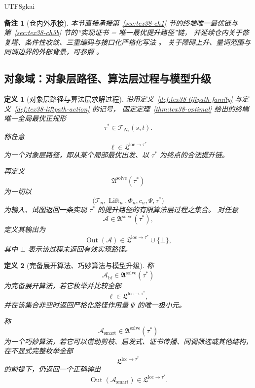 \documentclass[12pt]{article}
\newtheorem{definition}{定义}[section]
\newtheorem{remark}{备注}[section]
\newcommand{\Lift}{\operatorname{Lift}}
\begin{document}
\begin{CJK*}{UTF8}{gkai}
\begin{remark}[仓内外承接]
本节直接承接第~\ref{sec:tex38-ch1} 节的终端唯一最优链与第~\ref{sec:tex38-ch3b} 节的“实现证书 = 唯一最优提升路径”链，
并延续仓内关于修复塔、条件性收敛、三重编码与接口化严格化写法
\cite{RepoTex29TransfiniteRepair,RepoTex31RepairTower,RepoTex32ConditionalConvergence,RepoTex36HomotopyTwistBijection,
  RepoTex37GainEvaluation}。
关于障碍上升、量词范围与同调边界的外部背景，可参照
\cite{Whitehead1978Elements,Weibel1994HomologicalAlgebra}。
\end{remark}

\subsection{对象域：对象层路径、算法层过程与模型升级}
\label{subsec:tex38-smart-objects}

\begin{definition}[对象层路径与算法层求解过程]
\label{def:tex38-smart-objects}
沿用定义~\ref{def:tex38-liftpath-family} 与定义~\ref{def:tex38-liftpath-action} 的记号，
固定定理~\ref{thm:tex38-optimal} 给出的终端唯一全局最优正规形
\[
  \tau^\ast\in\mathcal T_{N_\ast}(s,t).
\]
称任意
\[
  \ell\in\mathfrak L^{\mathrm{loc}\to\tau^\ast}
\]
为一个\emph{对象层路径}，即从某个局部最优出发、以 $\tau^\ast$ 为终点的合法提升链。

再定义
\[
  \mathfrak A^{\mathrm{solve}}(\tau^\ast)
\]
为一切以
\[
  \bigl(\mathcal T_n,\Lift_n,\Phi_n,c_n,\Psi,\tau^\ast\bigr)
\]
为输入、试图返回一条实现 $\tau^\ast$ 的提升路径的有限算法层过程之集合。
对任意
\[
  \mathcal A\in\mathfrak A^{\mathrm{solve}}(\tau^\ast),
\]
定义其输出为
\[
  \operatorname{Out}(\mathcal A)\in
  \mathfrak L^{\mathrm{loc}\to\tau^\ast}\cup\{\bot\},
\]
其中 $\bot$ 表示该过程未返回有效实现路径。
\end{definition}

\begin{definition}[完备展开算法、巧妙算法与模型升级]
\label{def:tex38-smart-algorithm}
称
\[
  \mathcal A_{\mathrm{bf}}\in\mathfrak A^{\mathrm{solve}}(\tau^\ast)
\]
为\emph{完备展开算法}，若它枚举并比较全部
\[
  \ell\in\mathfrak L^{\mathrm{loc}\to\tau^\ast},
\]
并在该集合非空时返回严格化路径作用量 $\Psi$ 的唯一极小元。

称
\[
  \mathcal A_{\mathrm{smart}}\in\mathfrak A^{\mathrm{solve}}(\tau^\ast)
\]
为一个\emph{巧妙算法}，若它可以借助剪枝、启发式、证书传播、同调筛选或其他结构，
在不显式完整枚举全部
\[
  \mathfrak L^{\mathrm{loc}\to\tau^\ast}
\]
的前提下，仍返回一个正确输出
\[
  \operatorname{Out}(\mathcal A_{\mathrm{smart}})\in
  \mathfrak L^{\mathrm{loc}\to\tau^\ast}.
\]


\end{definition}
\end{CJK*}
\end{document}
